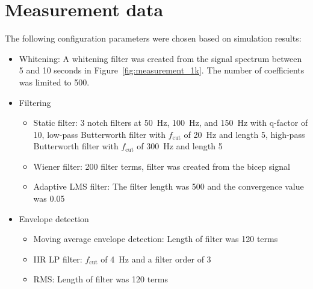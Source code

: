 \section{Measurement data}
The following configuration parameters were chosen based on simulation results:
\begin{itemize}
    \item Whitening: A whitening filter was created from the signal spectrum between 5 and 10 seconds in Figure~\ref{fig:measurement_1k}. The number of coefficients was limited to 500.
    \item Filtering
    \begin{itemize}
        \item Static filter: 3 notch filters at \SI{50}{\hertz}, \SI{100}{\hertz}, and \SI{150}{\hertz} with q-factor of 10, low-pass Butterworth filter with $f_\text{cut}$ of \SI{20}{\hertz} and length 5, high-pass Butterworth filter with $f_\text{cut}$ of \SI{300}{\hertz} and length 5
        \item Wiener filter: 200 filter terms, filter was created from the bicep signal
        \item Adaptive LMS filter: The filter length was 500 and the convergence value was 0.05
    \end{itemize}
    \item Envelope detection
    \begin{itemize}
        \item Moving average envelope detection: Length of filter was 120 terms
        \item IIR LP filter: $f_\text{cut}$ of \SI{4}{\hertz} and a filter order of 3
        \item RMS: Length of filter was 120 terms
    \end{itemize}
\end{itemize}


